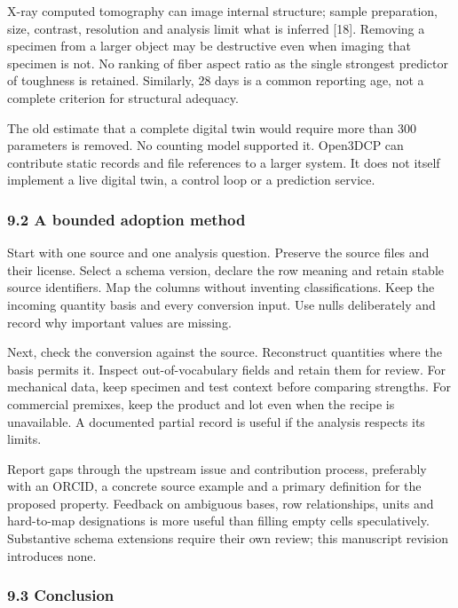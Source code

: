 \documentclass[
  american,
  11pt,
  letterpaper,
]{article}
\newcounter{none} %
\begin{document}
X-ray computed tomography can image internal structure; sample
preparation, size, contrast, resolution and analysis limit what is
inferred {[}18{]}. Removing a specimen from a larger object may be
destructive even when imaging that specimen is not. No ranking of fiber
aspect ratio as the single strongest predictor of toughness is retained.
Similarly, 28 days is a common reporting age, not a complete criterion
for structural adequacy.

The old estimate that a complete digital twin would require more than
300 parameters is removed. No counting model supported it. Open3DCP can
contribute static records and file references to a larger system. It
does not itself implement a live digital twin, a control loop or a
prediction service.

\subsubsection{9.2 A bounded adoption
method}\label{a-bounded-adoption-method}

Start with one source and one analysis question. Preserve the source
files and their license. Select a schema version, declare the row
meaning and retain stable source identifiers. Map the columns without
inventing classifications. Keep the incoming quantity basis and every
conversion input. Use nulls deliberately and record why important values
are missing.

Next, check the conversion against the source. Reconstruct quantities
where the basis permits it. Inspect out-of-vocabulary fields and retain
them for review. For mechanical data, keep specimen and test context
before comparing strengths. For commercial premixes, keep the product
and lot even when the recipe is unavailable. A documented partial record
is useful if the analysis respects its limits.

Report gaps through the upstream issue and contribution process,
preferably with an ORCID, a concrete source example and a primary
definition for the proposed property. Feedback on ambiguous bases, row
relationships, units and hard-to-map designations is more useful than
filling empty cells speculatively. Substantive schema extensions require
their own review; this manuscript revision introduces none.

\subsubsection{9.3 Conclusion}\label{conclusion}
\end{document}
